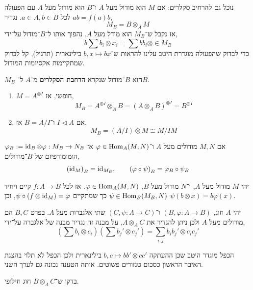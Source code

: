 נוכל גם להרחיב סקלרים:
אם $M$ הוא מודול מעל $A$ ו־$B$ הוא מודול מעל $A$ עם הפעולה $a b = f(a) b$ לכל $a \in A, b \in B$.
נגדיר,
\[
	M_B
	= B \otimes_A M
\]
אז נקבל ש־$M_B$ הוא מודל מעל $A$.
נהפוך אותו ל־$B$־מודול על־ידי,
\[
	b \sum b_i \otimes x_i
	= \sum b b_i \otimes
	\in M_B
\]
כדי לבדוק שהפעולה מוגדרת היטב עלינו להראות ש־$b, x \mapsto b x$ בילינארית (תרגיל), קל לבדוק שמתקיימות אקסיומות המודול.
\begin{definition}
	$M_B$ הוא $B$־מודול שנקרא \textbf{הרחבת הסקלרים} מ־$A$ ל־$B$.
\end{definition}
\begin{example}
	\begin{enumerate}
		\item $M = A^{\otimes I}$ חופשי, אז,
			\[
				M_B
				= A^{\otimes I} \otimes_A B
				= {(A \otimes_A B)}^{\otimes I}
				= B^{\otimes I}
			\]
		\item אם $I \triangleleft A$ ו־$B = A / I$ אז,
			\[
				M_B
				= (A / I) \otimes M
				\cong M / I M
			\]
	\end{enumerate}
\end{example}
\begin{exercise}
	אם $M, N$ מודולים מעל $A$ ו־$\varphi \in \operatorname{Hom}_A(M, N)$ אז $\varphi_B : = \operatorname{id}_B \otimes \varphi : M_B \to N_B$ הומומורפיזם של $B$־מודולים,
	\[
		{( \operatorname{id}_M )}_B
		= \operatorname{id}_{M_B},
		\qquad
		{(\varphi \circ \psi)}_B
		= \varphi_B \circ \psi_B
	\]
\end{exercise}
\begin{theorem}
	יהי $M$ מודול מעל $A$, ו־$N$ מודול מעל $B$, $\varphi \in \operatorname{Hom}_A(M, N)$.
	אז לכל $f : A \to B$ קיים ויחיד $\psi \in \operatorname{Hom}_B(M_B, N)$ כך שמתקיים $\psi \circ (f \otimes \operatorname{id}_M) = \varphi$, וכן $\psi(b \otimes x) = b \varphi(x)$.
\end{theorem}
\begin{definition}
	יהי $A$ חוג, $(B, \varphi : A \to B)$ ו־$(C, \psi : A \to C)$ שתי אלגברות מעל $A$.
	בפרט $B, C$ הם מודולים מעל $A$ ולכן ניתן להגדיר את $A \otimes_A C$, על מבנה זה נגדיר מבנה של אלגברה על־ידי,
	\[
		\left(\sum b_i \otimes c_i\right)\left(\sum b_j' \otimes c_j'\right)
		= \sum_{i, j} b_i b_j' \otimes c_i c_j'
	\]
\end{definition}
הכפל מוגדר היטב שכן ההעתקה $b, c \mapsto b b' \otimes c c'$ בילינארית ולכן הכפל לא תלוי בהצגת האיבר הראשון כסכום טנזורים פשוטים.
אותה הטענה נכונה גם לערך השני.
\begin{exercise}
	בדקו ש־$B \otimes_A C$ חוג חילופי.
\end{exercise}
